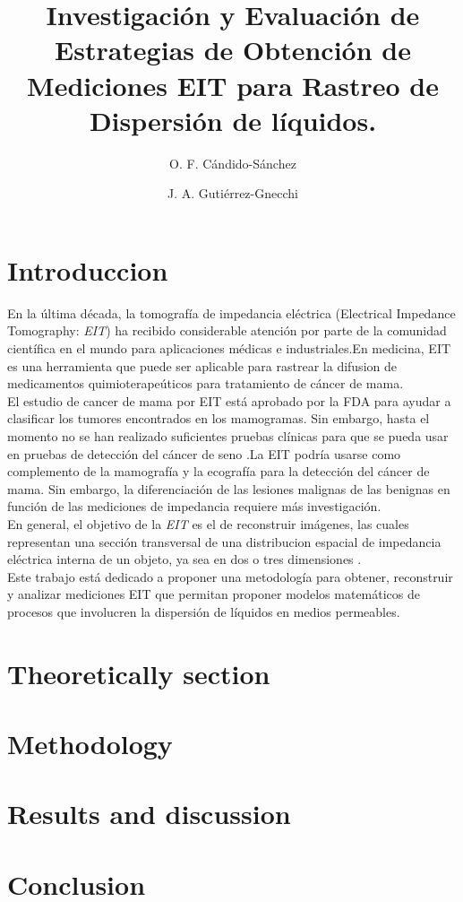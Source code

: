 \documentclass{IEEEtran}
\title{Investigación y Evaluación de Estrategias de Obtención de Mediciones EIT para Rastreo de Dispersión de líquidos. }
\author[1]{O. F. Cándido-Sánchez}
\author[1]{J. A. Gutiérrez-Gnecchi}
\affil[1]{Departamento de Ingeniería Electrónica, Instituto Tecnológico de Morelia}
\begin{document}
  \maketitle
  \begin{abstract}
  \end{abstract}

  \begin{IEEEkeywords}
  \end{IEEEkeywords}

  \section{Introduccion}
En la última década, la tomografía de impedancia eléctrica (Electrical Impedance Tomography: \textit{EIT}) ha recibido considerable atención por parte de la comunidad científica en el mundo para aplicaciones médicas e industriales.En medicina, EIT es una herramienta que puede ser aplicable para rastrear la difusion de medicamentos quimioterapeúticos para tratamiento de cáncer de mama\cite{Gnecchi2018}.\\
El estudio de cancer de mama por EIT está aprobado por la FDA para ayudar a clasificar los tumores encontrados en los mamogramas. Sin embargo, hasta el momento no se han realizado suficientes pruebas clínicas para que se pueda usar en pruebas de detección del cáncer de seno \cite{Cancer.org}.La EIT podría usarse como complemento de la mamografía y la ecografía para la detección del cáncer de mama. Sin embargo, la diferenciación de las lesiones malignas de las benignas en función de las mediciones de impedancia requiere más investigación\cite{Zou2003}.\\

En general, el objetivo de la \textit{EIT} es el de reconstruir imágenes, las cuales representan una sección transversal de una distribucion espacial de impedancia eléctrica interna de un objeto, ya sea en dos o tres dimensiones \cite{Gnecchi2012}.\\

Este trabajo está dedicado a proponer una metodología para obtener, reconstruir y analizar mediciones EIT que permitan proponer modelos matemáticos de procesos que involucren la dispersión de líquidos en medios permeables.\\


  \section{Theoretically section}
  \section{Methodology}
  \section{Results and discussion}
  \section{Conclusion}


\end{document}
